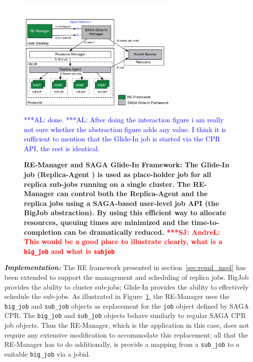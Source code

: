 \documentclass{rspublic}
\newcommand{\alnote}[1]{ {\textcolor{blue} { ***AL: #1 }}}
\newcommand{\jhanote}[1]{ {\textcolor{red} { ***SJ: #1 }}}
\newcommand{\alnote}[1]{}
\newcommand{\jhanote}[1]{}
\newcommand{\replicaagent}[1]{Replica-Agent }
\newcommand{\remanager}[1]{RE-Manager }
\begin{document}
\begin{figure}[t]
    \centering
    \includegraphics[width=0.7\textwidth]{re_bigjob_interactions}   
    \caption{\footnotesize \bf RE-Manager and SAGA Glide-In Framework:
      The Glide-In job (\replicaagent\ ) is used as place-holder job
      for all replica sub-jobs running on a single cluster. The
      \remanager\ can control both the \replicaagent\ and the replica
      jobs using a SAGA-based user-level job API (the BigJob
      abstraction). By using this efficient way to allocate resources,
      queuing times are minimized and the time-to-completion can be
      dramatically reduced. \jhanote{AndreL: This would be a good
        place to illustrate clearly, what is a \texttt{big\_job} and
        what is \texttt{sub\-job}}} \alnote{done.} \alnote{After doing
      the interaction figure i am really not sure whether the
      abstraction figure adds any value. I think it is sufficient to
      mention that the Glide-In job is started via the CPR API, the
      rest is identical.}
    \label{fig:remdmanager_v1.1}
\end{figure}
    
{\noindent \it \bf Implementation:} The RE framework presented in section~\ref{sec:remd_impl} has been
extended to support the management and scheduling of replica jobs.
BigJob provides the ability to cluster sub-jobs; Glide-In provides the
ability to effectively schedule the sub-jobs.  As illustrated in
Figure~\ref{fig:remdmanager_v1.1}, the RE-Manager uses the
\texttt{big\_job} and \texttt{sub\_job} objects as replacement for the
\texttt{job} object defined by SAGA CPR.  The \texttt{big\_job} and
\texttt{sub\_job} objects behave similarly to regular SAGA CPR job
objects. Thus the RE-Manager, which is the application in this case,
does not require any extensive modification to accommodate this
replacement; all that the RE-Manager has to do additionally, is
provide a mapping from a \texttt{sub\_job} to a suitable
\texttt{big\_job} via a jobid.
\end{document}
